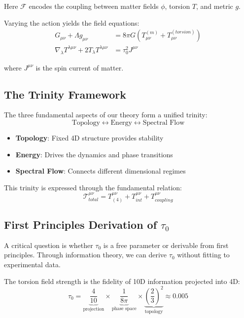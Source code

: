 Here $\mathcal{F}$ encodes the coupling between matter fields $\phi$, torsion $T$, and metric $g$.

Varying the action yields the field equations:
\begin{align}
    G_{\mu\nu} + \Lambda g_{\mu\nu} &= 8\pi G (T^{(m)}_{\mu\nu} + T^{(torsion)}_{\mu\nu}) \\
    \nabla_\lambda T^{\lambda\mu\nu} + 2T_\lambda T^{\lambda\mu\nu} &= \tau_0^2 J^{\mu\nu}
\end{align}

where $J^{\mu\nu}$ is the spin current of matter.

\subsection{The Trinity Framework}

The three fundamental aspects of our theory form a unified trinity:
\begin{equation}
    \text{Topology} \leftrightarrow \text{Energy} \leftrightarrow \text{Spectral Flow}
\end{equation}

\begin{itemize}
    \item \textbf{Topology}: Fixed 4D structure provides stability
    \item \textbf{Energy}: Drives the dynamics and phase transitions
    \item \textbf{Spectral Flow}: Connects different dimensional regimes
\end{itemize}

This trinity is expressed through the fundamental relation:
\begin{equation}
    \boxed{\mathcal{T}^{\mu\nu}_{total} = T^{\mu\nu}_{(4)} + T^{\mu\nu}_{int} + T^{\mu\nu}_{coupling}}
\end{equation}

\subsection{First Principles Derivation of $\tau_0$}

A critical question is whether $\tau_0$ is a free parameter or derivable from first principles. Through information theory, we can derive $\tau_0$ without fitting to experimental data.

\begin{theorem}
The torsion field strength is the fidelity of 10D information projected into 4D:
\begin{equation}
    \tau_0 = \underbrace{\frac{4}{10}}_{\text{projection}} \times \underbrace{\frac{1}{8\pi}}_{\text{phase space}} \times \underbrace{\left(\frac{2}{3}\right)^2}_{\text{topology}} \approx 0.005
\end{equation}
\end{theorem}

